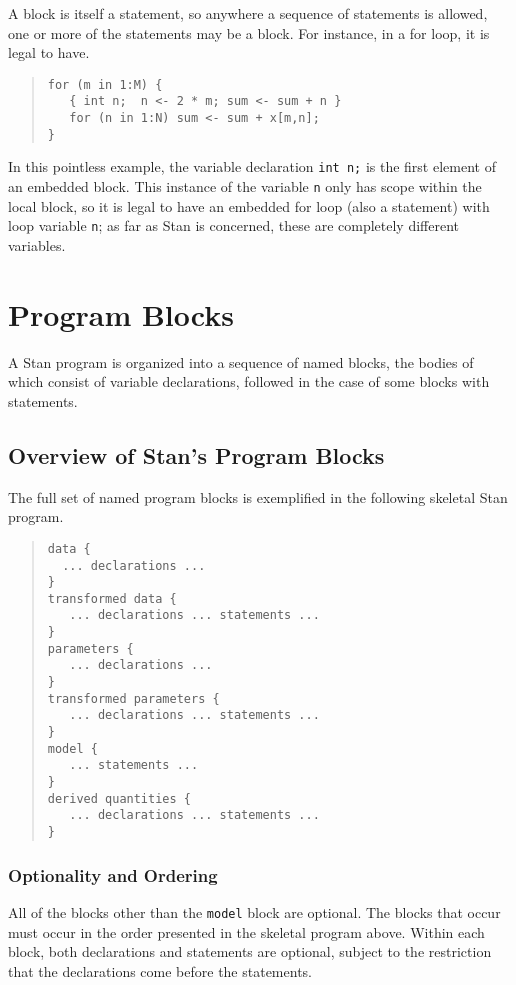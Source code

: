 \documentclass[10pt]{report}
\newcommand{\Stan}{Stan\xspace}
\newcommand{\code}[1]{{\tt #1}}
\begin{document}
A block is itself a statement, so anywhere a sequence of statements is
allowed, one or more of the statements may be a block.  For instance,
in a for loop, it is legal to have.
%
\begin{quote}
\begin{Verbatim}
for (m in 1:M) {
   { int n;  n <- 2 * m; sum <- sum + n }
   for (n in 1:N) sum <- sum + x[m,n];
}
\end{Verbatim}
\end{quote}
%
In this pointless example, the variable declaration \code{int n;} is
the first element of an embedded block.  This instance of the variable
\code{n} only has scope within the local block, so it is legal to have
an embedded for loop (also a statement) with loop variable \code{n};
as far as \Stan is concerned, these are completely different
variables.



\chapter{Program Blocks}\label{blocks.chapter}

A \Stan program is organized into a sequence of named blocks, the
bodies of which consist of variable declarations, followed in the case
of some blocks with statements.  

\section{Overview of \Stan's Program Blocks}

The full set of named program blocks is exemplified in the following
skeletal \Stan program.
%
\begin{quote}
\begin{Verbatim} 
data { 
  ... declarations ...
}
transformed data { 
   ... declarations ... statements ... 
}
parameters { 
   ... declarations ... 
}
transformed parameters { 
   ... declarations ... statements ...
}
model { 
   ... statements ...
}
derived quantities {
   ... declarations ... statements ...
}
\end{Verbatim}
\end{quote}
%

\subsection{Optionality and Ordering}

All of the blocks other than the \code{model} block are optional.  The
blocks that occur must occur in the order presented in the skeletal
program above.  Within each block, both declarations and statements
are optional, subject to the restriction that the declarations come
before the statements.
\end{document}
